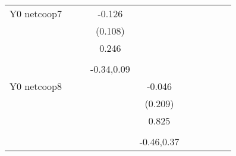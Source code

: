 \begin{table}[!h]
\begin{adjustbox}{width=\columnwidth,center}
\begin{tabular}{l*{8}{c}}
Y0 netcoop7         &                     &                     &      -0.126         &                     &                     &                     &                     &                     &                     &                     \\
                    &                     &                     &     (0.108)         &                     &                     &                     &                     &                     &                     &                     \\
                    &                     &                     &       0.246         &                     &                     &                     &                     &                     &                     &                     \\
                    &                     &                     &                     &                     &                     &                     &                     &                     &                     &                     \\
                    &                     &                     &  -0.34,0.09         &                     &                     &                     &                     &                     &                     &                     \\
Y0 netcoop8         &                     &                     &                     &      -0.046         &                     &                     &                     &                     &                     &                     \\
                    &                     &                     &                     &     (0.209)         &                     &                     &                     &                     &                     &                     \\
                    &                     &                     &                     &       0.825         &                     &                     &                     &                     &                     &                     \\
                    &                     &                     &                     &                     &                     &                     &                     &                     &                     &                     \\
                    &                     &                     &                     &  -0.46,0.37         &                     &                     &                     &                     &                     &                     \\

\end{tabular}
\end{adjustbox}
\end{table}

